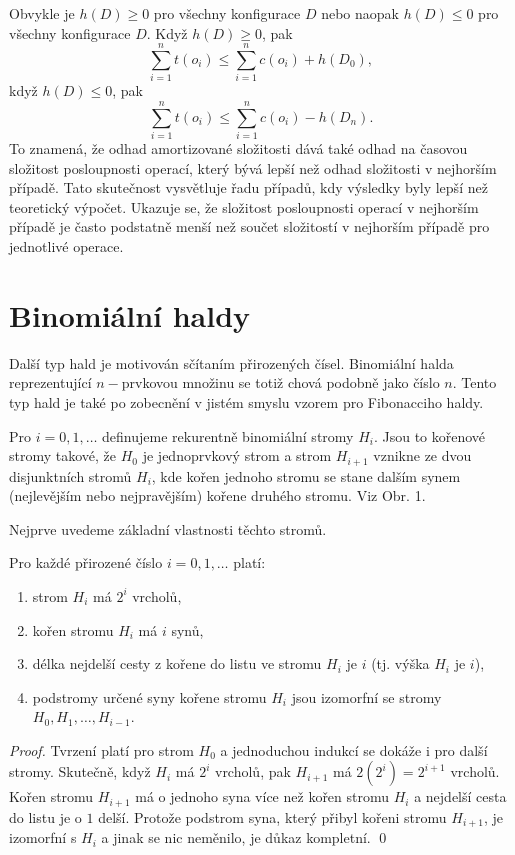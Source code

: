 \documentclass[a4paper,12pt]{article}
\begin{document}
Obvykle je $h(D)\ge 0$ pro všechny konfigurace $D$ 
nebo naopak $h(D)\le 0$ 
pro všechny konfigurace $D$. Když $h(D)\ge 0$, pak 
$$\sum_{i=1}^nt(o_i)\le\sum_{i=1}^nc(o_i)+h(D_0),$$
když $h(D)\le 0$, pak 
$$\sum_{i=1}^nt(o_i)\le\sum_{i=1}^nc(o_i)-h(D_n).$$
To znamená, že odhad amortizované složitosti dává také odhad 
na časovou složitost posloupnosti operací, který bývá lepší než odhad složitosti v 
nejhorším případě.  Tato skutečnost vysvětluje řadu 
případů, kdy 
výsledky byly lepší než teoretický výpočet.  Ukazuje se, že 
složitost posloupnosti operací v nejhorším případě je často podstatně 
menší než součet složitostí v nejhorším případě pro 
jednotlivé operace.  

\section{{Binomiální haldy}}

Další typ hald je motivován sčítaním přirozených čísel.  
Binomiální halda reprezentující $n-$prvkovou množinu se 
totiž chová 
podobně jako číslo $n$.  Tento typ hald je také po zobecnění v jistém 
smyslu vzorem pro Fibonacciho haldy.  

Pro $i=0,1,\dots$ definujeme rekurentně binomiální 
stromy $H_i$.  Jsou to kořenové stromy takové, že $H_0$ je 
jednoprvkový strom a  strom $H_{i+1}$ vznikne ze dvou 
disjunktních stromů $H_i$, kde kořen jednoho stromu  
se stane dalším synem (nejlevějším nebo nejpravějším) kořene druhého stromu.  Viz 
Obr.  1. 

\midinsert
\centerline{}
\endcaption
\endinsert

Nejprve uvedeme základní vlastnosti těchto 
stromů.

\begin{tvrzeni}Pro každé přirozené číslo $
i=0,1,\dots$ 
platí:
\begin{enumerate}
\item
strom $H_i$ má $2^i$ vrcholů,
\item
kořen stromu $H_i$ má $i$ synů,
\item
délka nejdelší cesty z kořene do listu ve stromu $H_i$ je 
$i$ (tj. výška $H_i$ je $i$),
\item
podstromy určené syny kořene stromu $H_i$ jsou izomorf\-ní 
se stromy $H_0,H_1,\dots,H_{i-1}$.
\end{enumerate}
\end{tvrzeni}

\begin{proof}Tvrzení platí pro strom $H_0$ a 
jednoduchou indukcí se dokáže i pro další stromy. 
Skutečně, když $H_i$ má $2^i$ vrcholů, pak $H_{
i+1}$ má 
$2(2^i)=2^{i+1}$ vrcholů. Kořen stromu $H_{i+1}$ má o jednoho 
syna více než kořen stromu $H_i$ a nejdelší cesta do listu je o $
1$ 
delší. Protože podstrom syna, který přibyl kořeni stromu 
$H_{i+1}$, je izomorfní s $H_i$ a jinak se nic neměnilo, je 
důkaz kompletní. \qed
\end{proof}
\end{document}
